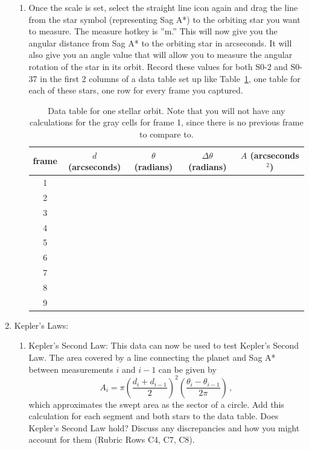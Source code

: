 \begin{enumerate}
\begin{enumerate}
		\item Once the scale is set, select the straight line icon again and drag the line from the star symbol
		(representing Sag A*) to the orbiting star you want to measure. The measure hotkey is ”m.”
		This will now give you the angular distance from Sag A* to the orbiting star in arcseconds.
		It will also give you an angle value that will allow you to measure the angular rotation of
		the star in its orbit. Record these values for both S0-2 and S0-37 in the first 2 columns of a data table set up like Table~\ref{gc:tab:orbits}, one table for each of these stars, one row for every frame you captured.
		
\begin{table}
	\centering
	\begin{tabular}{c|c|c|c|c}
		frame & $d$ (arcseconds) & $\theta$ (radians) & $\Delta \theta$ (radians) & $A$ (arcseconds$^2$)
		\\ \midrule
		1 & & & \cellcolor{black!25} & \cellcolor{black!25}
		\\ \midrule
		2 & & & & 
		\\ \midrule
		3 & & & & 
		\\ \midrule
		4 & & & & 
		\\ \midrule
		5 & & & & 
		\\ \midrule
		6 & & & & 
		\\ \midrule
		7 & & & & 
		\\ \midrule
		8 & & & & 
		\\ \midrule
		9 & & & & 
		\\ \bottomrule
	\end{tabular}
	\caption{Data table for one stellar orbit. Note that you will not have any calculations for the gray cells for frame 1, since there is no previous frame to compare to.}\label{gc:tab:orbits}
\end{table}		

	\end{enumerate}

	\item Kepler's Laws:
	\begin{enumerate}
		\item Kepler's Second Law: This data can now be used to test Kepler’s Second Law. The area
		covered by a line connecting the planet and Sag A* between measurements $i$ and $i - 1$ can
		be given by
		\begin{equation}
		 A_i = \pi \left( \frac{d_{i} + d_{i-1}}{2} \right)^2 \left( \frac{\theta_{i}-\theta_{i-1}}{2\pi} \right) \,,
		\end{equation}
		which approximates the swept area as the sector of a circle. Add this calculation for each
		segment and both stars to the data table. Does Kepler’s Second Law hold? Discuss any
		discrepancies and how you might account for them (Rubric Rows C4, C7, C8).
		

\end{enumerate}
\end{enumerate}
